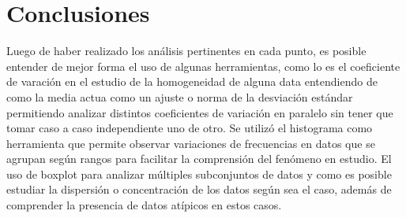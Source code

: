 \documentclass[letter,10pt]{article}
\begin{document}
\section{Conclusiones}
Luego de haber realizado los análisis pertinentes en cada punto, es posible entender de mejor forma el uso de algunas herramientas, como lo es el coeficiente de varación
en el estudio de la homogeneidad de alguna data entendiendo de como la media actua como un ajuste o norma de la desviación estándar permitiendo analizar
distintos coeficientes de variación en paralelo sin tener que tomar caso a caso independiente uno de otro. Se utilizó el histograma como herramienta que permite observar
variaciones de frecuencias en datos que se agrupan según rangos para facilitar la comprensión del fenómeno en estudio.
El uso de boxplot para analizar múltiples subconjuntos de datos y como es posible estudiar la dispersión o concentración de los datos según sea el caso, además de comprender
la presencia de datos atípicos en estos casos.



%
%

\end{document}
